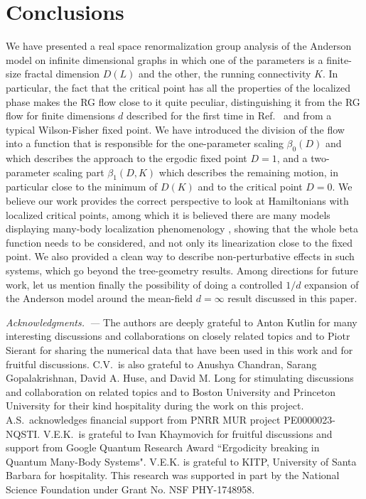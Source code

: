 \documentclass[reprint,aps,prl,superscriptaddress,english,nolongbibliography]{revtex4-1}
\begin{document}
\section*{Conclusions}
We have presented 
 a real space renormalization group analysis of the Anderson model on infinite dimensional graphs in which one of the parameters is a finite-size fractal dimension $D(L)$ and the other, the running connectivity $K$.  In particular, the fact that the critical point has all the properties of the localized phase makes the RG flow close to it quite peculiar, distinguishing it from the RG flow for finite dimensions $d$ described for the first time in Ref.~\cite{abrahams1979scaling} and from a typical Wilson-Fisher fixed point. We have introduced the division of the flow into a function that is responsible for the one-parameter scaling $\beta_0(D)$ and which describes the approach to the ergodic fixed point $D=1$, and a two-parameter scaling part $\beta_1(D,K)$ which describes the remaining motion, in particular close to the minimum of $D(K)$ and to the critical point $D=0$. We believe our work provides the correct perspective to look at Hamiltonians with localized critical points, among which it is believed there are many models displaying many-body localization phenomenology \cite{Deluca13}, showing that the whole beta function needs to be considered, and not only its linearization close to the fixed point. We also provided a clean way to describe non-perturbative effects in such systems, which go beyond the tree-geometry results. Among directions for future work, let us mention finally the possibility of doing a controlled $1/d$ expansion of the Anderson model around the mean-field $d=\infty$ result discussed in this paper.

\begin{acknowledgments}

\emph{Acknowledgments.~---}
The authors are deeply grateful to Anton Kutlin for many interesting discussions and collaborations on closely related topics and to Piotr Sierant for sharing the numerical data that have been used in this work and for fruitful discussions.
C.V.\ is also grateful to Anushya Chandran, Sarang Gopalakrishnan, David A. Huse, and David M. Long for stimulating discussions and collaboration on related topics and to Boston University and Princeton University for their kind hospitality during the work on this project. A.S.\ acknowledges financial support from PNRR MUR project PE0000023-NQSTI. V.E.K.\ is grateful to Ivan Khaymovich for fruitful discussions and support from Google Quantum Research Award ``Ergodicity breaking in Quantum Many-Body Systems". V.E.K. is grateful to KITP, University of Santa Barbara for hospitality. This research was supported in part by the National Science Foundation under Grant No. NSF PHY-1748958. 
 
\end{acknowledgments}
\end{document}

